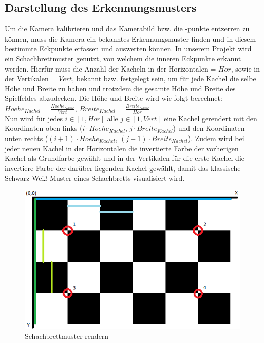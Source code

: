 \subsection{Darstellung des Erkennungsmusters}
Um die Kamera kalibrieren und das Kamerabild bzw. die -punkte entzerren zu können, muss die Kamera ein bekanntes Erkennungsmuster finden und in diesem bestimmte Eckpunkte erfassen und auswerten können. In unserem Projekt wird ein Schachbrettmuster genutzt, von welchem die inneren Eckpunkte erkannt werden. Hierfür muss die Anzahl der Kacheln in der Horizontalen = $Hor$, sowie in der Vertikalen = $Vert$, bekannt bzw. festgelegt sein, um für jede Kachel die selbe Höhe und Breite zu haben und trotzdem die gesamte Höhe und Breite des Spielfeldes abzudecken. Die Höhe und Breite wird wie folgt berechnet:\\
$Hoehe_{Kachel} = \frac{Hoehe_{Game}}{Vert}$, $Breite_{Kachel} = \frac{Breite_{Game}}{Hor}$\\
Nun wird für jedes $i \in [1,Hor]$ alle $j \in [1,Vert]$ eine Kachel gerendert mit den Koordinaten oben links ($i \cdot Hoehe_{Kachel}$, $j \cdot Breite_{Kachel}$) und den Koordinaten unten rechts ($(i+1) \cdot Hoehe_{Kachel}$, $(j+1) \cdot Breite_{Kachel}$). Zudem wird bei jeder neuen Kachel in der Horizontalen die invertierte Farbe der vorherigen Kachel als Grundfarbe gewählt und in der Vertikalen für die erste Kachel die invertiere Farbe der darüber liegenden Kachel gewählt, damit das klassische Schwarz-Weiß-Muster eines Schachbretts visualisiert wird.
\begin{figure}[h]
	\centering
	\includegraphics[scale=0.7]{bilder/schachbrett.PNG}
	\caption{Schachbrettmuster rendern}
\end{figure}

